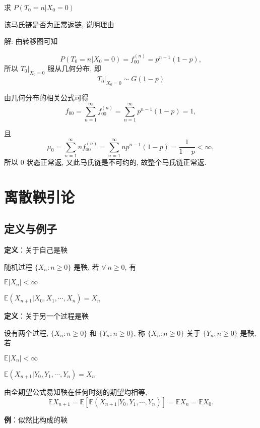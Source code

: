 \documentclass[openany]{ctexbook}
\theoremstyle{kaiti}
\theoremstyle{normal}
\begin{document}
求 $P(T_0=n|X_0=0)$

该马氏链是否为正常返链, 说明理由

解: 由转移图可知

\begin{equation}
  P(T_0=n|X_0=0)=f_{00}^{(n)}=p^{n-1}(1-p),
\end{equation}
所以 $T_0|_{X_0=0}$ 服从几何分布, 即
\begin{equation}
  T_0|_{X_0=0}\sim G(1-p)
\end{equation}

由几何分布的相关公式可得
\begin{equation}
 f_{00}=\sum_{n=1}^\infty f_{00}^{(n)}=\sum_{n=1}^\infty p^{n-1}(1-p)=1,
\end{equation}

且
\begin{equation}
  \mu_0=\sum_{n=1}^\infty nf_{00}^{(n)}=\sum_{n=1}^\infty np^{n-1}(1-p)=\frac{1}{1-p}<\infty,
\end{equation}
所以 $0$ 状态正常返, 又此马氏链是不可约的, 故整个马氏链正常返.

\chapter{离散鞅引论}

\section{定义与例子}

\textbf{定义}：关于自己是鞅

随机过程 $\{X_n:n\geqslant0\}$ 是鞅, 若 $\forall~n\geqslant0$, 有

$\mathbb{E}|X_n|<\infty$

$\mathbb{E}(X_{n+1}|X_0,X_1,\cdots,X_n)=X_n$

\textbf{定义}：关于另一个过程是鞅

设有两个过程, $\{X_n:n\geqslant0\}$ 和 $\{Y_n:n\geqslant0\}$, 称 $\{X_n:n\geqslant0\}$ 关于 $\{Y_n:n\geqslant0\}$ 是鞅, 若 

$\mathbb{E}|X_n|<\infty$

$\mathbb{E}(X_{n+1}|Y_0,Y_1,\cdots,Y_n)=X_n$

由全期望公式易知鞅在任何时刻的期望均相等,
\begin{equation}
  \mathbb{E}X_{n+1}=\mathbb{E}[\mathbb{E}(X_{n+1}|Y_0,Y_1,\cdots,Y_n)]=\mathbb{E}X_n=\mathbb{E}X_0.
\end{equation}

\textbf{例}：似然比构成的鞅
\end{document}
